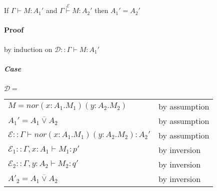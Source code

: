 \documentclass[12 pt]{article}
\begin{document}
       \begin{prooftree}
       \end{prooftree}
       \begin{prooftree}
       \end{prooftree}
       \begin{prooftree}
       \end{prooftree}
       If $\Gamma \vdash M : A_1'$ and $\Gamma \stackrel{\mathcal{E}}{\vdash} M:A_2 '$ then
       $A_1' = A_2'$
       \paragraph{Proof} by induction on $\mathcal{D} :: \Gamma
       \vdash M : A_1'$
       \subparagraph{Case} $\mathcal{D} =$
       \noLine{}
       \noLine{}
       \DP
       \\
       \begin{tabular}{l l}
         $M = nor (x:A_1.M_1)(y:A_2.M_2)$& by assumption
         \\ $A_1' = A_1 \overline{\lor} A_2$ & by assumption
         \\ $\mathcal{E} :: \Gamma \vdash nor(x:A_1.M_1)(y:A_2.M_2) : A_2'$ & by assumption
         \\ $\mathcal{E}_1 :: \Gamma, x:A_1 \vdash M_1 : p'$ & by inversion
         \\ $\mathcal{E}_2 :: \Gamma, y:A_2 \vdash M_2 : q'$ & by inversion
         \\ $A'_2 = A_1 \overline{\lor} A_2$ & by inversion
       \end{tabular}

      
\end{document}
